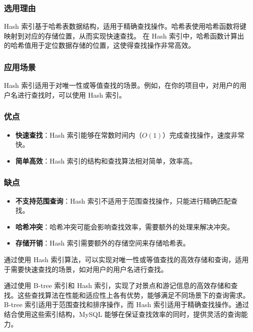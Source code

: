 \documentclass{ctexart}
\begin{document}
\subsubsection{选用理由}

Hash 索引基于哈希表数据结构，适用于精确查找操作。哈希表使用哈希函数将键映射到对应的存储位置，从而实现快速查找。
在 Hash 索引中，哈希函数计算出的哈希值用于定位数据存储的位置，这使得查找操作非常高效。

\subsubsection{应用场景}

Hash 索引适用于对唯一性或等值查找的场景。例如，在你的项目中，对用户的用户名进行查找时，可以使用 Hash 索引。

\subsubsection{优点}

\begin{itemize}
    \item \textbf{快速查找}：Hash 索引能够在常数时间内（$O(1)$）完成查找操作，速度非常快。
    \item \textbf{简单高效}：Hash 索引的结构和查找算法相对简单，效率高。
\end{itemize}

\subsubsection{缺点}

\begin{itemize}
    \item \textbf{不支持范围查询}：Hash 索引不适用于范围查找操作，只能进行精确匹配查找。
    \item \textbf{哈希冲突}：哈希冲突可能会影响查找效率，需要额外的处理来解决冲突。
    \item \textbf{存储开销}：Hash 索引需要额外的存储空间来存储哈希表。
\end{itemize}

通过使用 Hash 索引算法，可以实现对唯一性或等值查找的高效存储和查询，适用于需要快速查找的场景，如对用户的用户名进行查找。

通过使用 B-tree 索引和 Hash 索引，实现了对景点和游记信息的高效存储和查找。这些查找算法在性能和适应性上各有优势，能够满足不同场景下的查询需求。B-tree 索引适用于范围查找和排序操作，而 Hash 索引适用于精确查找操作。通过结合使用这些索引结构，MySQL 能够在保证查找效率的同时，提供灵活的查询能力。
\end{document}
